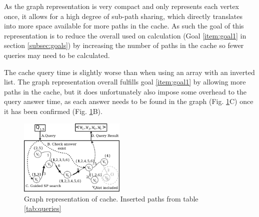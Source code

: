 As the graph representation is very compact and only represents each vertex once, it allows for a high degree of sub-path sharing, which directly translates into more space available for more paths in the cache. As such the goal of this representation is to reduce the overall \cet used on \spath calculation (Goal \ref{item:goal1} in section \ref{subsec:goals}) by increasing the number of paths in the cache so fewer queries may need to be calculated.

The cache query time is slightly worse than when using an array with an inverted list. The graph representation overall fulfills goal \ref{item:goal1} by allowing more paths in the cache, but it does unfortunately also impose some overhead to the query answer time, as each answer needs to be found in the graph (Fig. \ref{fig:cachegraph}C) once it has been confirmed (Fig. \ref{fig:cachegraph}B).

\begin{figure}[hbt]
  \center
        \includegraphics[width=0.45\textwidth]{figures/cachegraph}
        \caption{Graph representation of \spath cache. Inserted paths from table \ref{tab:queries}}
  \label{fig:cachegraph}
\end{figure}


